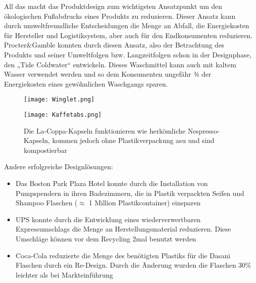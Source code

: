 \documentclass[13pt,titlepage]{article}
\begin{document}
	All das macht das Produktdesign zum wichtigsten Ansatzpunkt um den ökologischen Fußabdrucks eines Produkts zu reduzieren. 
Dieser Ansatz kann durch umweltfreundliche Entscheidungen die Menge an Abfall, die Energiekosten für Hersteller und Logistiksystem, aber auch für den Endkonsumenten reduzieren.\\
Procter\&Gamble konnten durch diesen Ansatz, also der Betrachtung des Produkts und seiner Umweltfolgen bzw. Langzeitfolgen schon in der Designphase, den „Tide Coldwater“ entwickeln. 
Dieses Waschmittel kann auch mit kaltem Wasser verwendet werden und so dem Konsumenten ungefähr ¾ der Energiekosten eines gew\"ohnlichen Waschgangs sparen.
	
	\begin{figure}[h]
	 \begin{minipage}[b]{.4\linewidth} %
	      \texttt{[image: Winglet.png]}
	      \caption{Eine Designänderung ist der Winglet. Diese erhöhen die Steiggeschwindigkeit und reduzieren die Treibstoffkosten. Der Kraftstoffverbrauch kann so um drei bis f\"unf Prozent gesenkt werden\protect\footnotemark  Bild\protect\footnotemark}
	   \end{minipage}
	   \hspace{0.2\linewidth}%
	   \begin{minipage}[b]{.4\linewidth} %
	      \texttt{[image: Kaffetabs.png]}
	      \caption{Die La-Coppa-Kapseln funktionieren wie herk\"omliche Nespresso-Kapseln, kommen jedoch ohne Plastikverpackung asu und sind kompostierbar\protect\footnotemark}
	   \end{minipage}
	\end{figure}

	Andere erfolgreiche Designlösungen:
	\begin{itemize}
	  \item Das Boston Park Plaza Hotel konnte durch die Installation von Pumpspendern in ihren Badezimmern, die in Plastik verpackten Seifen und Shampoo Flaschen ($\approx$ 1 Million Plastikcontainer) einsparen
	  \item UPS konnte durch die Entwicklung eines wiederverwertbaren Expressumschlags die Menge an Herstellungsmaterial reduzieren. Diese Umschläge können vor dem Recycling 2mal benutzt werden
	  \item Coca-Cola reduzierte die Menge des ben\"otigten Plastiks für die Dasani Flaschen durch ein Re-Design. Durch die \"Anderung wurden die Flaschen 30\% leichter als bei Markteinführung
	\end{itemize}
\end{document}
